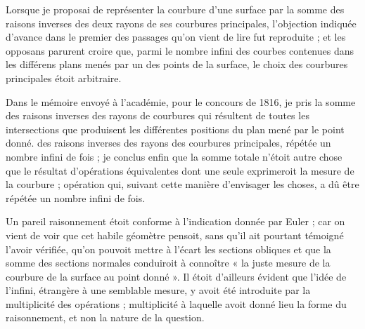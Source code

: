\documentclass[11pt,a4paper]{article}
\begin{document}
Lorsque je proposai de représenter la courbure d'une surface par la somme des
raisons inverses des deux rayons de ses courbures principales, l'objection
indiquée d'avance dans le premier des passages qu'on vient de lire fut
reproduite ; et les opposans parurent croire que, parmi le nombre infini des
courbes contenues dans les différens plans menés par un des points de la
surface, le choix des courbures principales étoit arbitraire.

Dans le mémoire envoyé à l'académie, pour le concours de 1816, je pris la
somme des raisons inverses des rayons de courbures qui résultent de toutes
les intersections que produisent les différentes positions du plan mené par
le point donné.
 des raisons inverses des
rayons des courbures principales, répétée un nombre infini de fois ; je
conclus enfin que la somme totale n'étoit autre chose que le résultat
d'opérations équivalentes dont une seule exprimeroit la mesure de la
courbure ; opération qui, suivant cette manière d'envisager les choses, a dû
être répétée un nombre infini de fois.



Un pareil raisonnement étoit conforme à l'indication donnée par Euler ; car
on vient de voir que cet habile géomètre pensoit, sans qu'il ait pourtant
témoigné l'avoir vérifiée, qu'on pouvoit mettre à l'écart les sections
obliques et que la somme des sections normales conduiroit à connoître « la
juste mesure de la courbure de la surface au point donné ». Il étoit
d'ailleurs évident que l'idée de l'infini, étrangère à une semblable mesure,
y avoit été introduite par la multiplicité des opérations ; multiplicité à
laquelle avoit donné lieu la forme du raisonnement, et non la nature de la
question.
\end{document}
